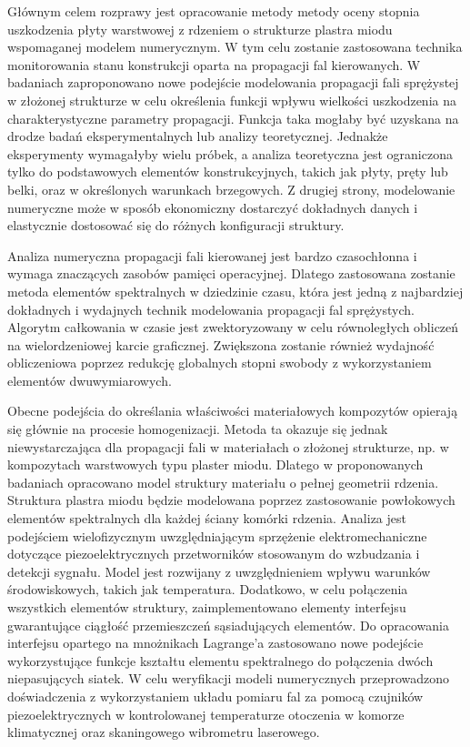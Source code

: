 {
{
Głównym celem rozprawy jest opracowanie metody metody oceny stopnia uszkodzenia płyty warstwowej z rdzeniem o strukturze plastra miodu wspomaganej modelem numerycznym.
W tym celu zostanie zastosowana technika monitorowania stanu konstrukcji oparta na propagacji fal kierowanych.
W badaniach zaproponowano nowe podejście modelowania propagacji fali sprężystej w złożonej strukturze w celu określenia funkcji wpływu wielkości uszkodzenia na charakterystyczne parametry propagacji.
Funkcja taka mogłaby być uzyskana na drodze badań eksperymentalnych lub analizy teoretycznej.
Jednakże eksperymenty wymagałyby wielu próbek, a analiza teoretyczna jest ograniczona tylko do podstawowych elementów konstrukcyjnych, takich jak płyty, pręty lub belki, oraz w określonych warunkach brzegowych. 
Z drugiej strony, modelowanie numeryczne może w sposób ekonomiczny dostarczyć dokładnych danych i elastycznie dostosować się do różnych konfiguracji struktury.

Analiza numeryczna propagacji fali kierowanej jest bardzo czasochłonna i wymaga znaczących zasobów pamięci operacyjnej.
Dlatego zastosowana zostanie metoda elementów spektralnych w dziedzinie czasu, która jest jedną z najbardziej dokładnych i wydajnych technik modelowania propagacji fal sprężystych.
Algorytm całkowania w czasie jest zwektoryzowany w celu równoległych obliczeń na wielordzeniowej karcie graficznej.
Zwiększona zostanie również wydajność obliczeniowa poprzez redukcję globalnych stopni swobody z wykorzystaniem elementów dwuwymiarowych.

Obecne podejścia do określania właściwości materiałowych kompozytów opierają się głównie na procesie homogenizacji.
Metoda ta okazuje się jednak niewystarczająca dla propagacji fali w materiałach o złożonej strukturze, np. w kompozytach warstwowych typu plaster miodu.
Dlatego w proponowanych badaniach opracowano model struktury materiału o pełnej geometrii rdzenia.
Struktura plastra miodu będzie modelowana poprzez zastosowanie powłokowych elementów spektralnych dla każdej ściany komórki rdzenia.
Analiza jest podejściem wielofizycznym uwzględniającym sprzężenie elektromechaniczne dotyczące piezoelektrycznych przetworników stosowanym do wzbudzania i detekcji sygnału. 
Model jest rozwijany z uwzględnieniem wpływu warunków środowiskowych, takich jak temperatura.
Dodatkowo, w celu połączenia wszystkich elementów struktury, zaimplementowano elementy interfejsu gwarantujące ciągłość przemieszczeń sąsiadujących elementów.
Do opracowania interfejsu opartego na mnożnikach Lagrange'a zastosowano nowe podejście wykorzystujące funkcje kształtu elementu spektralnego do połączenia dwóch niepasujących siatek.
W celu weryfikacji modeli numerycznych przeprowadzono doświadczenia z wykorzystaniem układu  pomiaru fal za pomocą czujników piezoelektrycznych w kontrolowanej temperaturze otoczenia w komorze klimatycznej oraz skaningowego wibrometru laserowego.

}}
